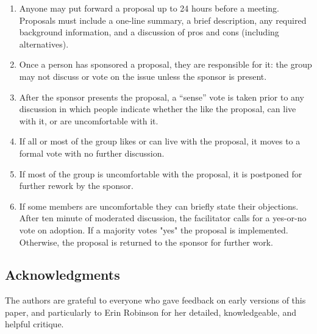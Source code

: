 \documentclass[10pt,letterpaper]{article}
\begin{document}
\begin{enumerate}

\item
  Anyone may put forward a proposal up to 24 hours before a meeting.
  Proposals must include a one-line summary,
  a brief description,
  any required background information,
  and a discussion of pros and cons (including alternatives).

\item
  Once a person has sponsored a proposal, they are responsible for it:
  the group may not discuss or vote on the issue unless the sponsor is present.

\item
  After the sponsor presents the proposal,
  a ``sense'' vote is taken prior to any discussion
  in which people indicate whether the like the proposal,
  can live with it,
  or are uncomfortable with it.

\item
  If all or most of the group likes or can live with the proposal,
  it moves to a formal vote with no further discussion.

\item
  If most of the group is uncomfortable with the proposal,
  it is postponed for further rework by the sponsor.

\item
  If some members are uncomfortable they can briefly state their objections.
  After ten minute of moderated discussion,
  the facilitator calls for a yes-or-no vote on adoption.
  If a majority votes "yes" the proposal is implemented.
  Otherwise, the proposal is returned to the sponsor for further work.

\end{enumerate}

\subsection*{Acknowledgments}

The authors are grateful to everyone who gave feedback on early versions of this paper,
and particularly to Erin Robinson for her detailed, knowledgeable, and helpful critique.
\end{document}
